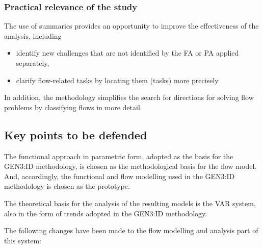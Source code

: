 \documentclass[a4paper,11pt]{article}
\begin{document}
\subsubsection{Practical relevance of the study}

The use of summaries provides an opportunity to improve the effectiveness of
the analysis, including
\begin{itemize}
\item identify new challenges that are not identified by the FA or PA applied
  separately,
\item clarify flow-related tasks by locating them (tasks) more precisely
\end{itemize}
In addition, the methodology simplifies the search for directions for solving
flow problems by classifying flows in more detail.

\subsection{Key points to be defended}

The functional approach in parametric form, adopted as the basis for the
GEN3:ID methodology, is chosen as the methodological basis for the flow
model. And, accordingly, the functional and flow modelling used in the GEN3:ID
methodology is chosen as the prototype.

The theoretical basis for the analysis of the resulting models is the VAR
system, also in the form of trends adopted in the GEN3:ID methodology.

The following changes have been made to the flow modelling and analysis part
of this system:
\end{document}
